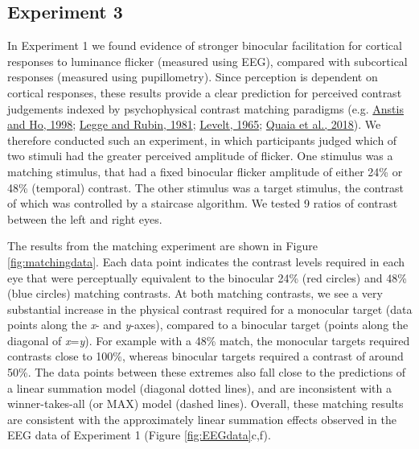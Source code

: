 \documentclass[
]{article}
\begin{document}
\hypertarget{experiment-3}{%
\subsection{Experiment 3}\label{experiment-3}}

In Experiment 1 we found evidence of stronger binocular facilitation for cortical responses to luminance flicker (measured using EEG), compared with subcortical responses (measured using pupillometry). Since perception is dependent on cortical responses, these results provide a clear prediction for perceived contrast judgements indexed by psychophysical contrast matching paradigms (e.g. \protect\hyperlink{ref-Anstis1998}{Anstis and Ho, 1998}; \protect\hyperlink{ref-Legge1981}{Legge and Rubin, 1981}; \protect\hyperlink{ref-Levelt1965}{Levelt, 1965}; \protect\hyperlink{ref-Quaia2018}{Quaia et al., 2018}). We therefore conducted such an experiment, in which participants judged which of two stimuli had the greater perceived amplitude of flicker. One stimulus was a matching stimulus, that had a fixed binocular flicker amplitude of either 24\% or 48\% (temporal) contrast. The other stimulus was a target stimulus, the contrast of which was controlled by a staircase algorithm. We tested 9 ratios of contrast between the left and right eyes.

The results from the matching experiment are shown in Figure \ref{fig:matchingdata}. Each data point indicates the contrast levels required in each eye that were perceptually equivalent to the binocular 24\% (red circles) and 48\% (blue circles) matching contrasts. At both matching contrasts, we see a very substantial increase in the physical contrast required for a monocular target (data points along the \emph{x}- and \emph{y}-axes), compared to a binocular target (points along the diagonal of \emph{x}=\emph{y}). For example with a 48\% match, the monocular targets required contrasts close to 100\%, whereas binocular targets required a contrast of around 50\%. The data points between these extremes also fall close to the predictions of a linear summation model (diagonal dotted lines), and are inconsistent with a winner-takes-all (or MAX) model (dashed lines). Overall, these matching results are consistent with the approximately linear summation effects observed in the EEG data of Experiment 1 (Figure \ref{fig:EEGdata}c,f).
\end{document}
